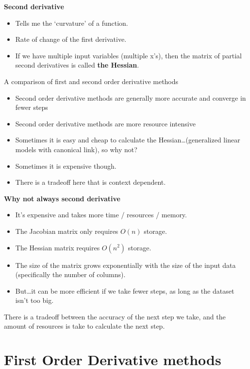 \documentclass[fontset=fandol,zihao=false,scheme=chinese,heading=true,UTF8]{ctexbook}
\providecommand{\tightlist}{%
  \setlength{\itemsep}{0pt}\setlength{\parskip}{0pt}}
\begin{document}
\textbf{Second derivative}

\begin{itemize}
\tightlist
\item
  Tells me the `curvature' of a function.
\item
  Rate of change of the first derivative.
\item
  If we have multiple input variables (multiple x's), then the matrix of partial second derivatives is called \textbf{the Hessian}.
\end{itemize}

A comparison of first and second order derivative methods

\begin{itemize}
\tightlist
\item
  Second order derivative methods are generally more accurate and converge in fewer steps
\item
  Second order derivative methods are more resource intensive
\item
  Sometimes it is easy and cheap to calculate the Hessian\ldots{}(generalized linear models with canonical link), so why not?
\item
  Sometimes it is expensive though.
\item
  There is a tradeoff here that is context dependent.
\end{itemize}

\textbf{Why not always second derivative}

\begin{itemize}
\tightlist
\item
  It's expensive and takes more time / resources / memory.
\item
  The Jacobian matrix only requires \(O(n)\) storage.
\item
  The Hessian matrix requires \(O(n^2)\) storage.
\item
  The size of the matrix grows exponentially with the size of the input data (specifically the number of columns).
\item
  But\ldots{}it can be more efficient if we take fewer steps, as long as the dataset isn't too big.
\end{itemize}

There is a tradeoff between the accuracy of the next step we take, and the amount of resources is take to calculate the next step.

\hypertarget{first-order-derivative-methods}{%
\section{First Order Derivative methods}\label{first-order-derivative-methods}}
\end{document}
